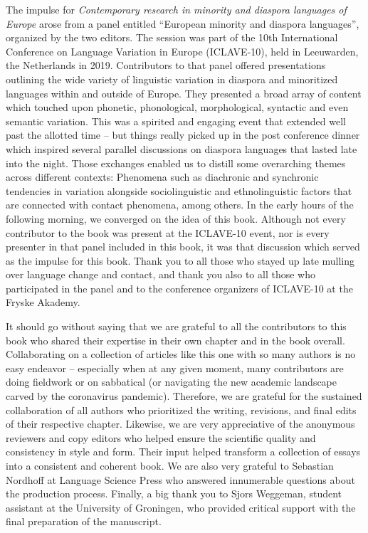 \begin{refsection}

The impulse for \textit{Contemporary research in minority and diaspora languages of Europe} arose from a panel entitled   ``European minority and diaspora languages'', organized by the two editors. The session was part of the 10th International Conference on Language Variation in Europe (ICLAVE-10), held in Leeuwarden, the Netherlands in 2019. Contributors to that panel offered presentations outlining the wide variety of linguistic variation in diaspora and minoritized languages within and outside of Europe. They presented a broad array of content which touched upon phonetic, phonological, morphological, syntactic and even semantic variation. This was a spirited and engaging event that extended well past the allotted time -- but things really picked up in the post conference dinner which inspired several parallel discussions on diaspora languages that lasted late into the night. Those exchanges enabled us to distill some overarching themes across different contexts: Phenomena such as diachronic and synchronic tendencies in variation alongside sociolinguistic and ethnolinguistic factors that are connected with contact phenomena, among others. In the early hours of the following morning, we converged on the idea of this book. Although not every contributor to the book was present at the ICLAVE-10 event, nor is every presenter in that panel included in this book, it was that discussion which served as the impulse for this book. Thank you to all those who stayed up late mulling over language change and contact, and thank you also to all those who participated in the panel and to the conference organizers of ICLAVE-10 at the Fryske Akademy.

It should go without saying that we are grateful to all the contributors to this book who shared their expertise in their own chapter and in the book overall. Collaborating on a collection of articles like this one with so many authors is no easy endeavor -- especially when at any given moment, many contributors are doing fieldwork or on sabbatical (or navigating the new academic landscape carved by the coronavirus pandemic). Therefore, we are grateful for the sustained collaboration of all authors who prioritized the writing, revisions, and final edits of their respective chapter. Likewise, we are very appreciative of the anonymous reviewers and copy editors who helped ensure the scientific quality and consistency in style and form. Their input helped transform a collection of essays into a consistent and coherent book. We are also very grateful to Sebastian Nordhoff at Language Science Press who answered innumerable questions about the production process. Finally, a big thank you to Sjors Weggeman, student assistant at the University of Groningen, who provided critical support with the final preparation of the manuscript. 


\end{refsection}
